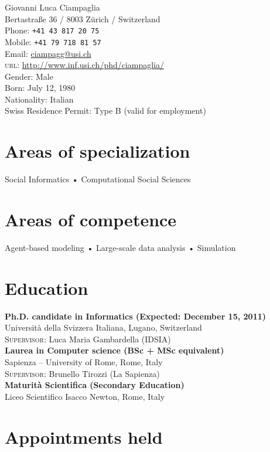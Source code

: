 \documentclass[10pt, a4paper]{article}
\newcommand{\years}[1]{\marginnote{\scriptsize #1}}
\begin{document}
{\LARGE Giovanni Luca Ciampaglia}\\[1cm]
Bertastraße 36 / 8003 Zürich / Switzerland\\[.2cm]
Phone: \texttt{+41 43 817 20 75}\\
Mobile: \texttt{+41 79 718 81 57}\\
Email: \href{mailto:ciampagg@usi.ch}{ciampagg@usi.ch}\\
\textsc{url}: \href{http://www.inf.usi.ch/phd/ciampaglia/}{http://www.inf.usi.ch/phd/ciampaglia/}\\[.2cm]
Gender: Male\\
Born:  July 12, 1980\\
Nationality: Italian\\
Swiss Residence Permit: Type B (valid for employment)

\section*{Areas of specialization}
Social Informatics • Computational Social Sciences

\section*{Areas of competence}
Agent-based modeling • Large-scale data analysis • Simulation

\section*{Education}
\noindent
\years{2011}\textbf{Ph.D. candidate in Informatics (Expected: December 15, 2011)}\\
Università della Svizzera Italiana, Lugano, Switzerland\\
\textsc{Supervisor}: Luca Maria Gambardella (IDSIA)\\[.1cm]
\years{2006}\textbf{Laurea in Computer science (BSc + MSc equivalent)}\\
Sapienza -- University of Rome, Rome, Italy\\
\textsc{Supervisor}: Brunello Tirozzi (La Sapienza)\\[.1cm]
\years{2000}\textbf{Maturità Scientifica (Secondary Education)}\\
Liceo Scientifico Isacco Newton, Rome, Italy\\[.1cm]

\section*{Appointments held}
\end{document}
